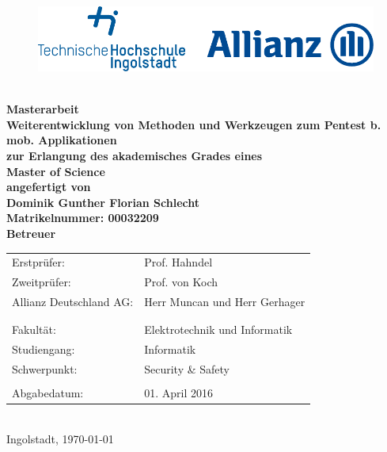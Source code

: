 
\begin{titlepage}

\phantom{tmpText}

\vspace{1cm}

\begin{figure}[h!]
\centering
\includegraphics[width=\textwidth]{bilder/thi_allianz_logo}
\end{figure}

  \begin{center}

    $ $
    \\[3ex]
    \textbf{{\large Masterarbeit} \\[3ex]
    {\LARGE Weiterentwicklung von Methoden und Werkzeugen zum Pentest b. mob. Applikationen}\\[6ex]
    zur Erlangung des akademisches Grades eines \\
    Master of Science\\[2ex]
    \vfill
    angefertigt von \\
    Dominik Gunther Florian Schlecht \\
    {\small \normalfont Matrikelnummer: 00032209}\\[2ex] %
    \vfill
    Betreuer} \\[2ex]
    \begin{tabular}{ll}
      Erstprüfer: & Prof. Hahndel \\
      Zweitprüfer: & Prof. von Koch \\
      Allianz Deutschland AG: & Herr Muncan und Herr Gerhager\\
      \\
      \\
      Fakultät: & Elektrotechnik und Informatik\\
      Studiengang: & Informatik\\
      Schwerpunkt: & Security \& Safety\\
      \\
      Abgabedatum: & 01. April 2016
    \end{tabular} \\[2ex]
    \vfill
    Ingolstadt, \today
  \end{center}
\end{titlepage}
